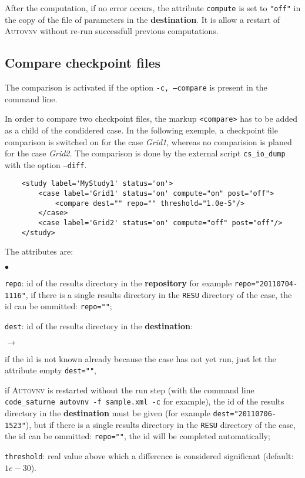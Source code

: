 \documentclass[a4paper,10pt,twoside]{article}
\begin{document}
After the computation, if no error occurs, the attribute \texttt{compute} is set to \texttt{"off"}
in the copy of the file of parameters in the \textbf{destination}. It is allow a restart
of \textsc{Autovnv} without re-run successfull previous computations.

\subsection{Compare checkpoint files}

The comparison is activated if the option \texttt{-c, --compare} is present in the command line.

In order to compare two checkpoint files, the markup \texttt{<compare>} has to be added as
a child of the condidered case. In the following exemple, a checkpoint file comparison
is switched on for the case \textit{Grid1}, whereas no comparision is planed for the case
\textit{Grid2}.
The comparison is done by the external script \texttt{cs\_io\_dump} with the option \texttt{--diff}.

\begin{verbatim}
    <study label='MyStudy1' status='on'>
        <case label='Grid1' status='on' compute="on" post="off">
            <compare dest="" repo="" threshold="1.0e-5"/>
        </case>
        <case label='Grid2' status='on' compute="off" post="off"/>
    </study>
\end{verbatim}

The attributes are:
\begin{list}{$\bullet$}{}

\item \texttt{repo}: id of the results directory in the \textbf{repository} for example \texttt{repo="20110704-1116"},
if there is a single results directory in the \texttt{RESU} directory of the case, the id can be ommitted: \texttt{repo=""};

\item \texttt{dest}: id of the results directory in the \textbf{destination}:
\begin{list}{$\rightarrow$}{}
\item if the id is not known already because the case has not yet run, just let the attribute empty \texttt{dest=""},
\item if \textsc{Autovnv} is restarted without the run step (with the command line \texttt{code\_saturne
autovnv -f sample.xml -c} for example), the id of the results directory in
the \textbf{destination} must be given (for example \texttt{dest="20110706-1523"}), but if there is a single results directory in the \texttt{RESU} directory
of the case, the id can be ommitted: \texttt{repo=""}, the id will be completed automatically;
\end{list}
\item \texttt{threshold}: real value above which a difference is considered significant (default: $1e-30$).
\end{list}
\end{document}
